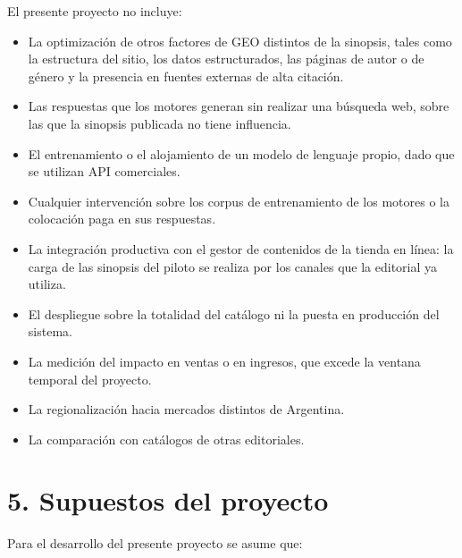 \documentclass[
11pt, %
codirector, %
]{charter}
\begin{document}
El presente proyecto no incluye:

\begin{itemize}
	\item La optimización de otros factores de GEO distintos de la sinopsis, tales como la estructura del sitio, los datos estructurados, las páginas de autor o de género y la presencia en fuentes externas de alta citación.
	\item Las respuestas que los motores generan sin realizar una búsqueda web, sobre las que la sinopsis publicada no tiene influencia.
	\item El entrenamiento o el alojamiento de un modelo de lenguaje propio, dado que se utilizan API comerciales.
	\item Cualquier intervención sobre los corpus de entrenamiento de los motores o la colocación paga en sus respuestas.
	\item La integración productiva con el gestor de contenidos de la tienda en línea: la carga de las sinopsis del piloto se realiza por los canales que la editorial ya utiliza.
	\item El despliegue sobre la totalidad del catálogo ni la puesta en producción del sistema.
	\item La medición del impacto en ventas o en ingresos, que excede la ventana temporal del proyecto.
	\item La regionalización hacia mercados distintos de Argentina.
	\item La comparación con catálogos de otras editoriales.
\end{itemize}

\section{5. Supuestos del proyecto}
\label{sec:supuestos}

Para el desarrollo del presente proyecto se asume que:
\end{document}
